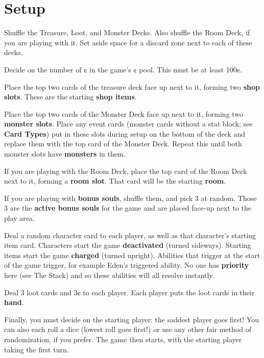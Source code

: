 \documentclass[../main.tex]{subfiles}
\begin{document}
  \chapter{Setup}
  Shuffle the Treasure, Loot, and Monster Decks. Also shuffle the Room Deck, if you are playing with it. Set aside space for a discard zone next to each of these decks.

  Decide on the number of ¢ in the game’s ¢ pool. This must be at least 100¢.

  Place the top two cards of the treasure deck face up next to it, forming two \textbf{shop slots}. These are the starting \textbf{shop items}.

  Place the top two cards of the Monster Deck face up next to it, forming two \textbf{monster slots}. Place any event cards (monster cards without a stat block; see \textbf{Card Types}) put in these slots during setup on the bottom of the deck and replace them with the top card of the Monster Deck. Repeat this until both monster slots have \textbf{monsters} in them.

  If you are playing with the Room Deck, place the top card of the Room Deck next to it, forming a \textbf{room slot}. That card will be the starting \textbf{room}.

  If you are playing with \textbf{bonus souls}, shuffle them, and pick 3 at random. Those 3 are the \textbf{active bonus souls} for the game and are placed face-up next to the play area.

  Deal a random character card to each player, as well as that character’s starting item card. Characters start the game \textbf{deactivated} (turned sideways). Starting items start the game \textbf{charged} (turned upright). Abilities that trigger at the start of the game trigger, for example Eden’s triggered ability. No one has \textbf{priority} here (see The Stack) and so these abilities will all resolve instantly.

  Deal 3 loot cards and 3¢ to each player. Each player puts the loot cards in their \textbf{hand}.

  Finally, you must decide on the starting player: the saddest player goes first! You can also each roll a dice (lowest roll goes first!) or use any other fair method of randomization, if you prefer. The game then starts, with the starting player taking the first turn.
\end{document}
